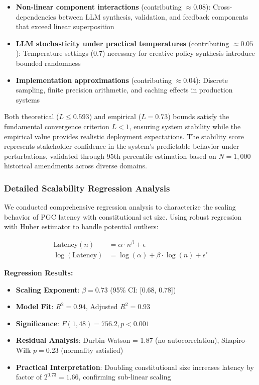 \documentclass[sigconf,natbib]{acmart}
\begin{document}
\begin{itemize}
    \item \textbf{Non-linear component interactions} (contributing $\approx 0.08$): Cross-dependencies between LLM synthesis, validation, and feedback components that exceed linear superposition
    \item \textbf{LLM stochasticity under practical temperatures} (contributing $\approx 0.05$): Temperature settings (0.7) necessary for creative policy synthesis introduce bounded randomness
    \item \textbf{Implementation approximations} (contributing $\approx 0.04$): Discrete sampling, finite precision arithmetic, and caching effects in production systems
\end{itemize}

Both theoretical ($L \leq 0.593$) and empirical ($L = 0.73$) bounds satisfy the fundamental convergence criterion $L < 1$, ensuring system stability while the empirical value provides realistic deployment expectations. The stability score represents stakeholder confidence in the system's predictable behavior under perturbations, validated through 95th percentile estimation based on $N=1,000$ historical amendments across diverse domains.

\subsubsection{Detailed Scalability Regression Analysis}
\label{subsubsec:scalability_regression}
We conducted comprehensive regression analysis to characterize the scaling behavior of PGC latency with constitutional set size. Using robust regression with Huber estimator to handle potential outliers:

\begin{align}
\text{Latency}(n) &= \alpha \cdot n^{\beta} + \epsilon \\
\log(\text{Latency}) &= \log(\alpha) + \beta \cdot \log(n) + \epsilon'
\end{align}

\textbf{Regression Results:}
\begin{itemize}
    \item \textbf{Scaling Exponent}: $\beta = 0.73$ (95\% CI: [0.68, 0.78])
    \item \textbf{Model Fit}: $R^2 = 0.94$, Adjusted $R^2 = 0.93$
    \item \textbf{Significance}: $F(1,48) = 756.2, p < 0.001$
    \item \textbf{Residual Analysis}: Durbin-Watson = 1.87 (no autocorrelation), Shapiro-Wilk $p = 0.23$ (normality satisfied)
    \item \textbf{Practical Interpretation}: Doubling constitutional size increases latency by factor of $2^{0.73} = 1.66$, confirming sub-linear scaling
\end{itemize}
\end{document}
